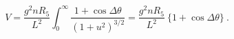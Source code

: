\begin{equation}
V=\frac{g^2n R_5}{ L^2}\int_0^{\infty}\frac{1+\cos 
\Delta\theta}{(1+u^2)^{3/2}}
=\frac{g^2n R_5}{ L^2}\ \{1+\cos\Delta\theta\}\ .
\end{equation}

